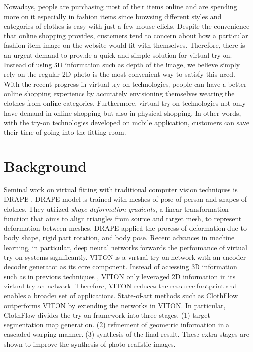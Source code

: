 \documentclass{article}
\begin{document}
Nowadays, people are purchasing most of their items online and are spending more on it especially in fashion items since browsing different styles and categories of clothes is easy with just a few mouse clicks. Despite the convenience that online shopping provides, customers tend to concern about how a particular fashion item image on the website would fit with themselves. Therefore, there is an urgent demand to provide a quick and simple solution for virtual try-on. Instead of using 3D information such as depth of the image, we believe simply rely on the regular 2D photo is the most convenient way to satisfy this need. With the recent progress in virtual try-on technologies, people can have a better online shopping experience by accurately envisioning themselves wearing the clothes from online categories. Furthermore, virtual try-on technologies not only have demand in online shopping but also in physical shopping. In other words, with the try-on technologies developed on mobile application, customers can save their time of going into the fitting room.

\section{Background}

Seminal work on virtual fitting with traditional computer vision techniques is DRAPE \cite{guan2012drape}. DRAPE model is trained with meshes of pose of person and shapes of clothes. They utilized \textit{shape deformation gradients}, a linear transformation function that aims to align triangles from source and target mesh, to represent deformation between meshes. DRAPE applied the process of deformation due to body shape, rigid part rotation, and body pose. Recent advances in machine learning, in particular, deep neural networks forwards the performance of virtual try-on systems significantly. VITON \cite{han2018viton} is a virtual try-on network with an encoder-decoder generator as its core component. Instead of accessing 3D information such as in previous techniques \cite{guan2012drape}, VITON only leveraged 2D information in its virtual try-on network. Therefore, VITON reduces the resource footprint and enables a broader set of applications. State-of-art methods such as ClothFlow \cite{han2019clothflow} outperforms VITON by extending the networks in VITON. In particular, ClothFlow divides the try-on framework into three stages. (1) target segmentation map generation. (2) refinement of geometric information in a cascaded warping manner. (3) synthesis of the final result. These extra stages are shown to improve the synthesis of photo-realistic images. 
\end{document}
